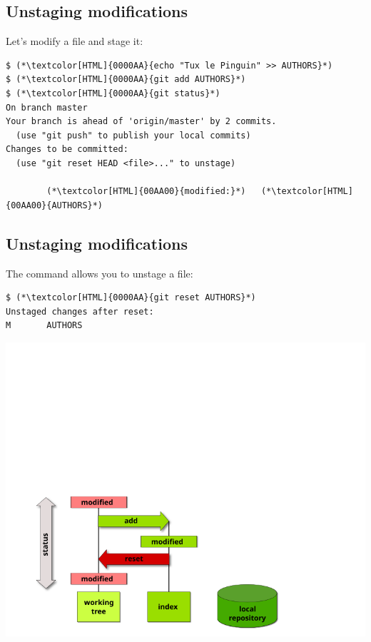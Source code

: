 \subsection{Unstaging modifications}
\begin{frame}[fragile]
\subslidetitle

  Let's modify a file and stage it:

\begin{lstlisting}
$ (*\textcolor[HTML]{0000AA}{echo "Tux le Pinguin" >> AUTHORS}*)
$ (*\textcolor[HTML]{0000AA}{git add AUTHORS}*)
$ (*\textcolor[HTML]{0000AA}{git status}*)
On branch master
Your branch is ahead of 'origin/master' by 2 commits.
  (use "git push" to publish your local commits)
Changes to be committed:
  (use "git reset HEAD <file>..." to unstage)

        (*\textcolor[HTML]{00AA00}{modified:}*)   (*\textcolor[HTML]{00AA00}{AUTHORS}*)
\end{lstlisting}

\end{frame}

\subsection{Unstaging modifications}
\begin{frame}[fragile]
\subslidetitle

  The command  allows you to unstage a file:

  \begin{lstlisting}
$ (*\textcolor[HTML]{0000AA}{git reset AUTHORS}*)
Unstaged changes after reset:
M       AUTHORS
\end{lstlisting}

  \vspace{1em}
  \centerline{\includegraphics{diagrams/undo-staged}}
\end{frame}


